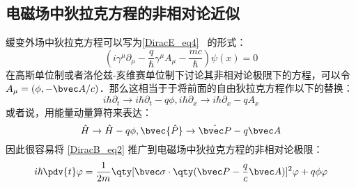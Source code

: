 \subsection{电磁场中狄拉克方程的非相对论近似}
缓变外场中狄拉克方程可以写为\autoref{DiracE_eq4}~ 的形式：
\begin{equation}
(i\gamma^\mu \partial_\mu -\frac{q}{\hbar}\gamma^\mu A_\mu - \frac{mc}{\hbar})\psi(x)=0
\end{equation}
在高斯单位制或者洛伦兹-亥维赛单位制下讨论其非相对论极限下的方程，可以令 $A_\mu=(\phi,-\bvec A/c)$．那么这相当于于将前面的自由狄拉克方程作以下的替换：
\begin{equation}
i\hbar \partial_t \rightarrow i\hbar\partial_t -q\phi, i\hbar\partial_x\rightarrow i\hbar\partial_x - qA_x
\end{equation}
或者说，用能量动量算符来表达：
\begin{equation}
\hat H\rightarrow \hat H-q\phi,\bvec{\hat P}\rightarrow \hat {\bvec P}-q\bvec A
\end{equation}
因此很容易将 \autoref{DiracB_eq2} 推广到电磁场中狄拉克方程的非相对论极限：
\begin{equation}
i\hbar\pdv{t} \varphi = \frac{1}{2m}\qty[\bvec \sigma \cdot\qty(\bvec P - \frac{q}{c}\bvec A)]^2 \varphi + q\phi  \varphi
\end{equation}